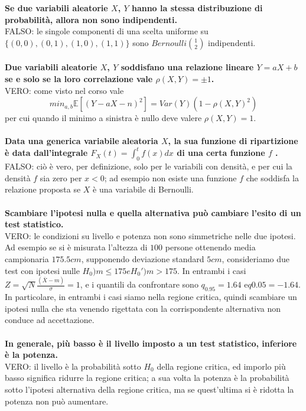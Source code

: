 \noindent\textbf{Se due variabili aleatorie $X$, $Y$ hanno la stessa distribuzione di probabilità, allora non sono indipendenti.}\\
FALSO: le singole componenti di una scelta uniforme su $\{(0, 0), (0, 1), (1, 0), (1, 1)\}$ sono $Bernoulli\binom{1}{2}$ indipendenti.\\\\

\noindent\textbf{Due variabili aleatorie $X$, $Y$ soddisfano una relazione lineare $Y = aX + b$ se e solo se la loro correlazione vale $\rho(X, Y ) = \pm1$.}\\
VERO: come visto nel corso vale
\begin{equation*}
	min_{a,b}\mathbb{E}[(Y-aX-n)^2] = Var(Y)(1-\rho(X,Y)^2)
\end{equation*}
per cui quando il minimo a sinistra è nullo deve valere $\rho(X,Y)=1$.\\\\

\noindent \textbf{Data una generica variabile aleatoria $X$, la sua funzione di ripartizione è data dall'integrale $F_X(t)=\int_{0}^{t}f(x)dx$ di una certa funzione $f$ .}\\
FALSO: ciò è vero, per definizione, solo per le variabili con densità, e per cui la densità $f$ sia zero per $x < 0$; ad esempio non esiste una funzione $f$ che soddisfa la relazione proposta se $X$ è una variabile di Bernoulli.\\\\

\noindent\textbf{Scambiare l’ipotesi nulla e quella alternativa può cambiare l’esito di un test statistico.}\\
VERO: le condizioni su livello e potenza non sono simmetriche nelle due ipotesi. Ad esempio se si è misurata l’altezza di $100$ persone ottenendo media campionaria $175.5cm$, supponendo deviazione standard $5cm$, consideriamo due test con ipotesi nulle $H_0 )m \leq 175 e H_0')m > 175$. In entrambi i casi $Z = \sqrt{N} \frac{(\bar{X} - m)}{\sigma} = 1$, e i quantili da confrontare sono $q_{0.95} = 1.64$ e$q{0.05} = -1.64$. In particolare, in entrambi i casi siamo nella regione
critica, quindi scambiare un ipotesi nulla che sta venendo rigettata con la corrispondente alternativa non conduce ad accettazione.\\\\

\noindent\textbf{In generale, più basso è il livello imposto a un test statistico, inferiore è la potenza.}\\
VERO: il livello è la probabilità sotto $H_0$ della regione critica, ed imporlo più basso significa ridurre la regione critica; a sua volta la potenza è la probabilità sotto l’ipotesi alternativa della regione critica, ma se quest'ultima si è ridotta la potenza non può aumentare.\\\\

